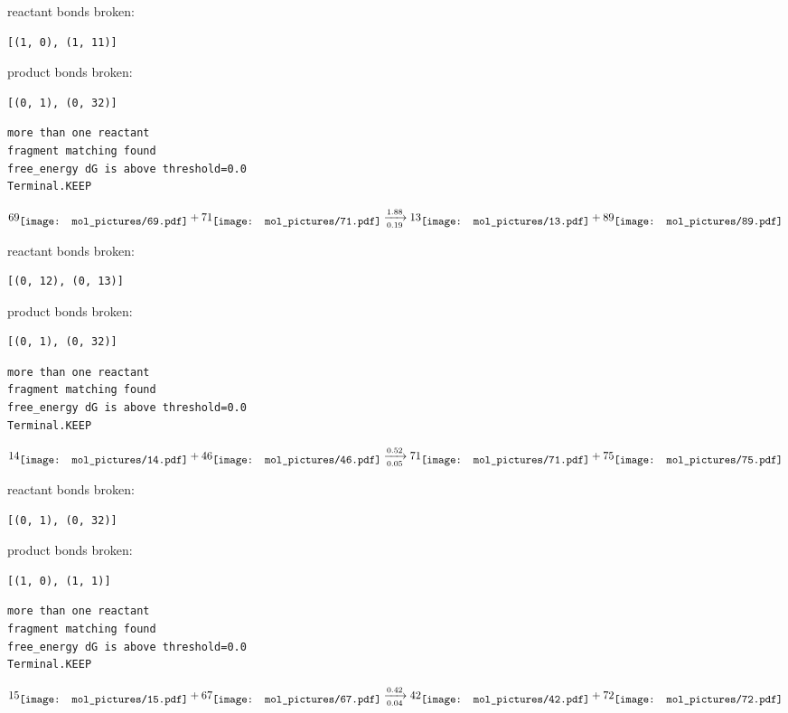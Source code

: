 \documentclass{article}
\begin{document}
reactant bonds broken:\begin{verbatim}
[(1, 0), (1, 11)]
\end{verbatim}
product bonds broken:\begin{verbatim}
[(0, 1), (0, 32)]
\end{verbatim}




\vspace{1cm}
\begin{verbatim}
more than one reactant
fragment matching found
free_energy dG is above threshold=0.0
Terminal.KEEP
\end{verbatim}
$$
69
\raisebox{-.5\height}{\texttt{[image: mol\_pictures/69.pdf]}}
+
71
\raisebox{-.5\height}{\texttt{[image: mol\_pictures/71.pdf]}}
\xrightarrow[0.19]{1.88}
13
\raisebox{-.5\height}{\texttt{[image: mol\_pictures/13.pdf]}}
+
89
\raisebox{-.5\height}{\texttt{[image: mol\_pictures/89.pdf]}}
$$


reactant bonds broken:\begin{verbatim}
[(0, 12), (0, 13)]
\end{verbatim}
product bonds broken:\begin{verbatim}
[(0, 1), (0, 32)]
\end{verbatim}




\vspace{1cm}
\begin{verbatim}
more than one reactant
fragment matching found
free_energy dG is above threshold=0.0
Terminal.KEEP
\end{verbatim}
$$
14
\raisebox{-.5\height}{\texttt{[image: mol\_pictures/14.pdf]}}
+
46
\raisebox{-.5\height}{\texttt{[image: mol\_pictures/46.pdf]}}
\xrightarrow[0.05]{0.52}
71
\raisebox{-.5\height}{\texttt{[image: mol\_pictures/71.pdf]}}
+
75
\raisebox{-.5\height}{\texttt{[image: mol\_pictures/75.pdf]}}
$$


reactant bonds broken:\begin{verbatim}
[(0, 1), (0, 32)]
\end{verbatim}
product bonds broken:\begin{verbatim}
[(1, 0), (1, 1)]
\end{verbatim}




\vspace{1cm}
\begin{verbatim}
more than one reactant
fragment matching found
free_energy dG is above threshold=0.0
Terminal.KEEP
\end{verbatim}
$$
15
\raisebox{-.5\height}{\texttt{[image: mol\_pictures/15.pdf]}}
+
67
\raisebox{-.5\height}{\texttt{[image: mol\_pictures/67.pdf]}}
\xrightarrow[0.04]{0.42}
42
\raisebox{-.5\height}{\texttt{[image: mol\_pictures/42.pdf]}}
+
72
\raisebox{-.5\height}{\texttt{[image: mol\_pictures/72.pdf]}}
$$
\end{document}
